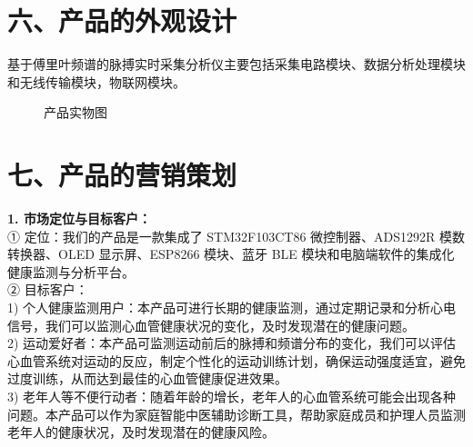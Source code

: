 \documentclass[a4paper,12pt]{article}
\begin{document}
\section*{六、产品的外观设计}
基于傅里叶频谱的脉搏实时采集分析仪主要包括采集电路模块、数据分析处理模块和无线传输模块，物联网模块。

\begin{figure}[H]
    \centering
    \caption{产品实物图}
\end{figure}

\section*{七、产品的营销策划}
\textbf{1. 市场定位与目标客户：}\\
① 定位：我们的产品是一款集成了 STM32F103CT86 微控制器、ADS1292R 模数转换器、OLED 显示屏、ESP8266 模块、蓝牙 BLE 模块和电脑端软件的集成化健康监测与分析平台。\\
② 目标客户：\\
1) 个人健康监测用户：本产品可进行长期的健康监测，通过定期记录和分析心电信号，我们可以监测心血管健康状况的变化，及时发现潜在的健康问题。\\
2) 运动爱好者：本产品可监测运动前后的脉搏和频谱分布的变化，我们可以评估心血管系统对运动的反应，制定个性化的运动训练计划，确保运动强度适宜，避免过度训练，从而达到最佳的心血管健康促进效果。\\
3) 老年人等不便行动者：随着年龄的增长，老年人的心血管系统可能会出现各种问题。本产品可以作为家庭智能中医辅助诊断工具，帮助家庭成员和护理人员监测老年人的健康状况，及时发现潜在的健康风险。
\end{document}
